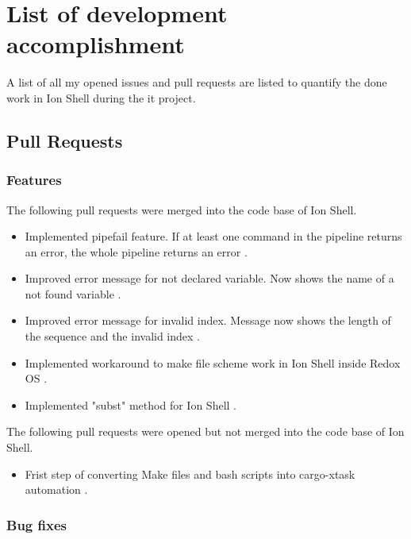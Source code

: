 \chapter{List of development accomplishment}

A list of all my opened issues and pull requests are listed to quantify the done work in Ion Shell
during the it project.

\section{Pull Requests}

\subsection{Features}
\label{accomplishment_features}

The following pull requests were merged into the code base of Ion Shell.

\begin{itemize}
	\item Implemented pipefail feature. If at least one command in the pipeline returns an error, the whole pipeline returns an error \cite{pr_pipefail}.
	\item Improved error message for not declared variable. Now shows the name of a not found variable \cite{pr_better_not_found_variable_show}.
	\item Improved error message for invalid index. Message now shows the length of the sequence and the invalid index \cite{pr_error_message_shows_invalid_range}.
	\item Implemented workaround to make file scheme work in Ion Shell inside Redox OS \cite{pr_file_scheme}.
	\item Implemented "subst" method for Ion Shell \cite{pr_subst_method}.
\end{itemize}

The following pull requests were opened but not merged into the code base of Ion Shell.

\begin{itemize}
	\item Frist step of converting Make files and bash scripts into cargo-xtask automation \cite{pr_still_opened_cargo_xtask}.
\end{itemize}

\subsection{Bug fixes}\label{accomplishment_bug_fixes}


